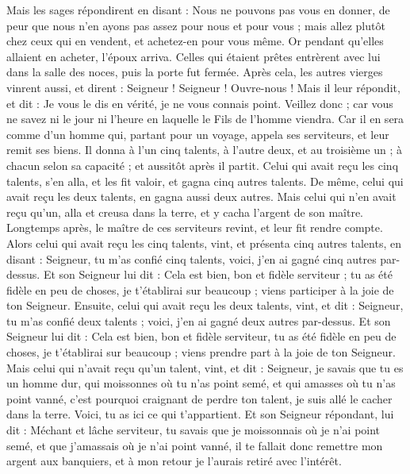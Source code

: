 \begin{multicols}{2}
Mais les sages répondirent en disant : Nous ne pouvons pas vous en donner, de peur que nous n'en ayons pas assez pour nous et pour vous ; mais allez plutôt chez ceux qui en vendent, et achetez-en pour vous même.
Or pendant qu'elles allaient en acheter, l'époux arriva. Celles qui étaient prêtes entrèrent avec lui dans la salle des noces, puis la porte fut fermée.
Après cela, les autres vierges vinrent aussi, et dirent : Seigneur ! Seigneur ! Ouvre-nous !
Mais il leur répondit, et dit : Je vous le dis en vérité, je ne vous connais point.
Veillez donc ; car vous ne savez ni le jour ni l'heure en laquelle le Fils de l'homme viendra.
Car il en sera comme d'un homme qui, partant pour un voyage, appela ses serviteurs, et leur remit ses biens.
Il donna à l'un cinq talents, à l'autre deux, et au troisième un ; à chacun selon sa capacité ; et aussitôt après il partit.
Celui qui avait reçu les cinq talents, s'en alla, et les fit valoir, et gagna cinq autres talents.
De même, celui qui avait reçu les deux talents, en gagna aussi deux autres.
Mais celui qui n'en avait reçu qu'un, alla et creusa dans la terre, et y cacha l'argent de son maître.
Longtemps après, le maître de ces serviteurs revint, et leur fit rendre compte.
Alors celui qui avait reçu les cinq talents, vint, et présenta cinq autres talents, en disant : Seigneur, tu m'as confié cinq talents, voici, j'en ai gagné cinq autres par-dessus.
Et son Seigneur lui dit : Cela est bien, bon et fidèle serviteur ; tu as été fidèle en peu de choses, je t'établirai sur beaucoup ; viens participer à la joie de ton Seigneur.
Ensuite, celui qui avait reçu les deux talents, vint, et dit : Seigneur, tu m'as confié deux talents ; voici, j'en ai gagné deux autres par-dessus.
Et son Seigneur lui dit : Cela est bien, bon et fidèle serviteur, tu as été fidèle en peu de choses, je t'établirai sur beaucoup ; viens prendre part à la joie de ton Seigneur.
Mais celui qui n'avait reçu qu'un talent, vint, et dit : Seigneur, je savais que tu es un homme dur, qui moissonnes où tu n'as point semé, et qui amasses où tu n'as point vanné,
c'est pourquoi craignant de perdre ton talent, je suis allé le cacher dans la terre. Voici, tu as ici ce qui t'appartient.
Et son Seigneur répondant, lui dit : Méchant et lâche serviteur, tu savais que je moissonnais où je n'ai point semé, et que j'amassais où je n'ai point vanné,
il te fallait donc remettre mon argent aux banquiers, et à mon retour je l'aurais retiré avec l'intérêt.

\end{multicols}
